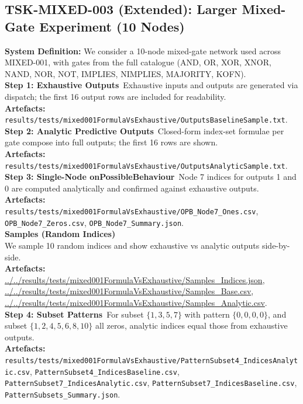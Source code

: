 \documentclass{article}
\begin{document}
\subsection{TSK-MIXED-003 (Extended): Larger Mixed-Gate Experiment (10 Nodes)}
\textbf{System Definition:} We consider a 10-node mixed-gate network used across MIXED-001, with gates from the full catalogue (AND, OR, XOR, XNOR, NAND, NOR, NOT, IMPLIES, NIMPLIES, MAJORITY, KOFN).\\
\textbf{Step 1: Exhaustive Outputs}\
Exhaustive inputs and outputs are generated via dispatch; the first 16 output rows are included for readability.\\
\textbf{Artefacts:} \texttt{results/tests/mixed001FormulaVsExhaustive/OutputsBaselineSample.txt}.\\

\textbf{Step 2: Analytic Predictive Outputs}\
Closed-form index-set formulae per gate compose into full outputs; the first 16 rows are shown.\\
\textbf{Artefacts:} \texttt{results/tests/mixed001FormulaVsExhaustive/OutputsAnalyticSample.txt}.\\

\textbf{Step 3: Single-Node onPossibleBehaviour}\
Node 7 indices for outputs 1 and 0 are computed analytically and confirmed against exhaustive outputs.\\
\textbf{Artefacts:} \texttt{results/tests/mixed001FormulaVsExhaustive/OPB\_Node7\_Ones.csv}, \texttt{OPB\_Node7\_Zeros.csv}, \texttt{OPB\_Node7\_Summary.json}.\\
\textbf{Samples (Random Indices)}\\ We sample 10 random indices and show exhaustive vs analytic outputs side-by-side.\\
\textbf{Artefacts:} \url{../../results/tests/mixed001FormulaVsExhaustive/Samples_Indices.json}, \url{../../results/tests/mixed001FormulaVsExhaustive/Samples_Base.csv}, \url{../../results/tests/mixed001FormulaVsExhaustive/Samples_Analytic.csv}.\\
\textbf{Step 4: Subset Patterns}\
For subset \(\{1,3,5,7\}\) with pattern \(\{0,0,0,0\}\), and subset \(\{1,2,4,5,6,8,10\}\) all zeros, analytic indices equal those from exhaustive outputs.\\
\textbf{Artefacts:} \texttt{results/tests/mixed001FormulaVsExhaustive/PatternSubset4\_IndicesAnalytic.csv}, \texttt{PatternSubset4\_IndicesBaseline.csv}, \texttt{PatternSubset7\_IndicesAnalytic.csv}, \texttt{PatternSubset7\_IndicesBaseline.csv}, \texttt{PatternSubsets\_Summary.json}.\\
\end{document}
